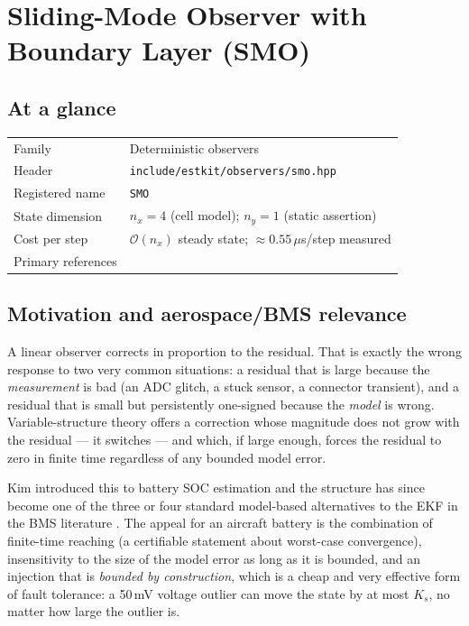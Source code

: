 \chapter{Sliding-Mode Observer with Boundary Layer (SMO)}
\label{ch:smo}

\section*{At a glance}
\begin{tabular}{@{}l>{\raggedright\arraybackslash}p{}@{}}
Family & Deterministic observers \\
Header & \texttt{include/estkit/observers/smo.hpp} \\
Registered name & \texttt{SMO} \\
State dimension & $n_x = 4$ (cell model); $n_y = 1$ (static assertion) \\
Cost per step & $\mathcal{O}(n_x)$ steady state; $\approx 0.55\,\mu$s/step measured \\
Primary references & \cite{utkin1992,slotine1987sliding,kim2006smo,kim2008smo} \\
\end{tabular}

\section{Motivation and aerospace/BMS relevance}
A linear observer corrects in proportion to the residual.  That is exactly the wrong response to
two very common situations: a residual that is large because the \emph{measurement} is bad (an
ADC glitch, a stuck sensor, a connector transient), and a residual that is small but persistently
one-signed because the \emph{model} is wrong.  Variable-structure theory
\cite{utkin1992} offers a correction whose magnitude does not grow with the residual --- it
switches --- and which, if large enough, forces the residual to zero in finite time regardless of
any bounded model error.

Kim \cite{kim2006smo,kim2008smo} introduced this to battery SOC estimation and the structure has
since become one of the three or four standard model-based alternatives to the EKF in the BMS
literature \cite{xiong2018review}.  The appeal for an aircraft battery is the combination of
finite-time reaching (a certifiable statement about worst-case convergence), insensitivity to the
size of the model error as long as it is bounded, and an injection that is \emph{bounded by
construction}, which is a cheap and very effective form of fault tolerance: a 50\,mV voltage
outlier can move the state by at most $K_s$, no matter how large the outlier is.

